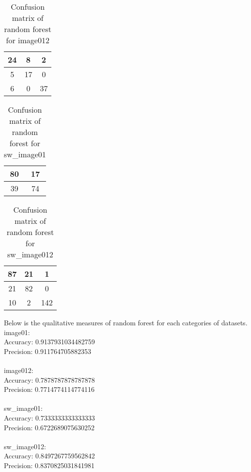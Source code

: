 \documentclass[conference,12pt]{IEEEtran}
\begin{document}
\begin{table}[h!]
\centering
\caption{Confusion matrix of random forest for image012}
\begin{tabular}{|c|c|c|}
\hline
24 & 8 & 2 \\ \hline
5 & 17 & 0 \\ \hline
6 & 0 & 37 \\ \hline
\end{tabular}
\end{table}

\begin{table}[h!]
\centering
\caption{Confusion matrix of random forest for sw\_image01}
\begin{tabular}{|c|c|}
\hline
80 & 17 \\ \hline
39 & 74 \\ \hline
\end{tabular}
\end{table}

\begin{table}[h!]
\centering
\caption{Confusion matrix of random forest for sw\_image012}
\begin{tabular}{|c|c|c|}
\hline
87 & 21 & 1 \\ \hline
21 & 82 & 0 \\ \hline
10 & 2 & 142 \\ \hline
\end{tabular}
\end{table}

Below is the qualitative measures of random forest for each categories of datasets.
\\
image01:\\
Accuracy: 0.9137931034482759\\
Precision: 0.911764705882353\\
\\
image012:\\
Accuracy: 0.7878787878787878\\
Precision: 0.7714774114774116\\
\\
sw\_image01:\\
Accuracy: 0.7333333333333333\\
Precision: 0.6722689075630252\\
\\
sw\_image012:\\
Accuracy: 0.8497267759562842\\
Precision: 0.8370825031841981\\
\end{document}
